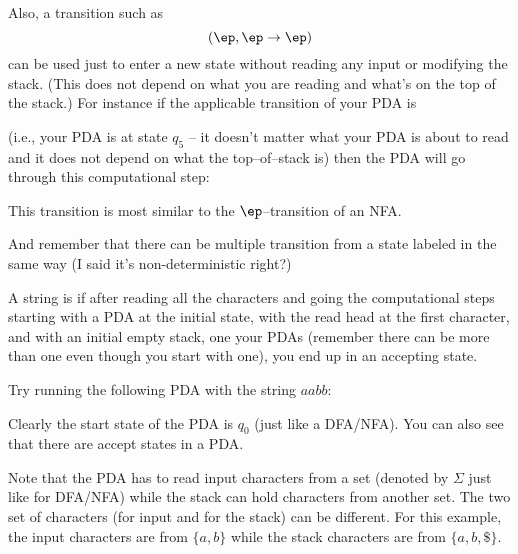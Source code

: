 

Also, a transition such as
\[
(\ep, \ep\rightarrow \ep)
\]
can be used just to enter a new state without reading any input
or modifying the stack.
(This does not depend on what you are reading and what's on the
top of the stack.)
For instance if the applicable transition of your PDA is


(i.e., your PDA is at state $q_5$  --
it doesn't matter what your PDA is about to read and it
does not depend on what the top--of--stack is)
then the PDA will go through this computational step:



This transition is most similar to the $\ep$--transition of an NFA.

And remember that there can be multiple transition from a 
state labeled in the same way (I said it's non-deterministic right?)

A string is  if after reading all the characters
and going the computational steps starting with a PDA
at the initial state, with the read head at the first character, and with
an initial empty stack,
one your PDAs (remember there can be more than one even though you start
with one),
you end up in an accepting state.

\newpage
Try running the following PDA with the string $aabb$:

\begin{center}
\end{center}

Clearly the start state of the PDA is $q_0$ (just like a DFA/NFA).
You can also see that there are accept states in a PDA.

Note that the PDA has to read input characters from a set (denoted
by $\Sigma$ just like for DFA/NFA)
while the stack can hold characters from another set.
The two set of characters (for input and for the stack)
can be different.
For this example, the input characters are from $\{a, b\}$
while the stack characters are from $\{a, b, \$\}$.

